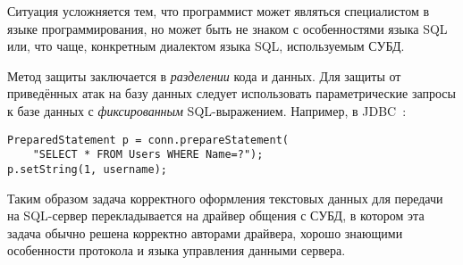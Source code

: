 Ситуация усложняется тем, что программист может являться специалистом в языке программирования, но может быть не знаком с особенностями языка SQL или, что чаще, конкретным диалектом языка SQL, используемым СУБД.

Метод защиты заключается в \emph{разделении} кода и данных. Для защиты от приведённых атак на базу данных следует использовать параметрические запросы к базе данных с \emph{фиксированным} SQL-выражением. Например, в JDBC~\cite{jdbc:2006}:
\begin{verbatim}
PreparedStatement p = conn.prepareStatement(
    "SELECT * FROM Users WHERE Name=?");
p.setString(1, username);
\end{verbatim}

Таким образом задача корректного оформления текстовых данных для передачи на SQL-сервер перекладывается на драйвер общения с СУБД, в котором эта задача обычно решена корректно авторами драйвера, хорошо знающими особенности протокола и языка управления данными сервера.

